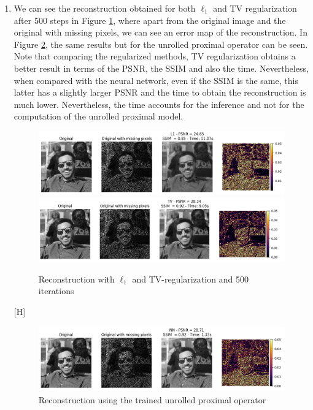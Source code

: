 \documentclass{article}
\begin{document}
\begin{enumerate}[label=2.\arabic*]
    \item
    
    We can see the reconstruction obtained for both $\ell_1$ and TV regularization after 500 steps in Figure \ref{fig:rec_500}, where apart from the original image and the original with missing pixels, we can see an error map of the reconstruction. In Figure \ref{fig:rec_nn}, the same results but for the unrolled proximal operator can be seen. Note that comparing the regularized methods, TV regularization obtains a better result in terms of the PSNR, the SSIM and also the time. Nevertheless, when compared with the neural network, even if the SSIM is the same, this latter has a slightly larger PSNR and the time to obtain the reconstruction is much lower. Nevertheless, the time accounts for the inference and not for the computation of the unrolled proximal model.
    
    \begin{figure}[H]
        \centering
        \includegraphics[trim={.5cm .5cm 0cm 0cm},clip,width=\textwidth]{img/reconstruction_l1.png}
        \includegraphics[trim={.5cm .5cm .5cm 0cm},clip,width=\textwidth]{img/reconstruction_tv.png}
        \caption{Reconstruction with $\ell_1$ and TV-regularization and 500 iterations}
        \label{fig:rec_500}
    \end{figure}[H]
    \begin{figure}
        \centering
        \includegraphics[trim={.5cm .5cm .5cm 0cm},clip,width=\textwidth]{img/reconstruction_nn.png}
        \caption{Reconstruction using the trained unrolled proximal operator}
        \label{fig:rec_nn}
    \end{figure}
    

\end{enumerate}
\end{document}

